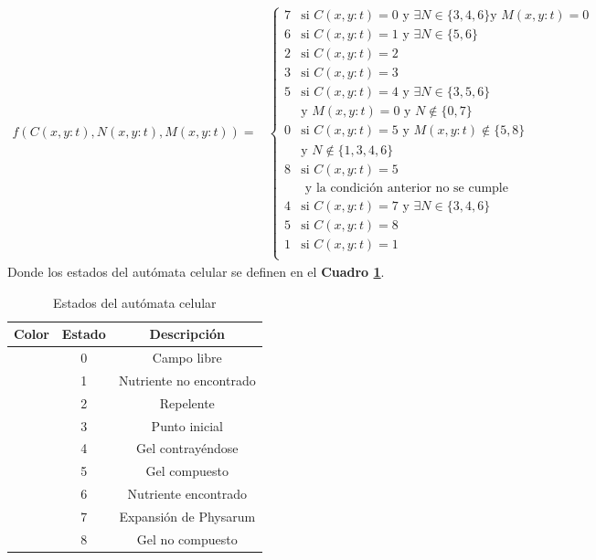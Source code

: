    \begin{equation*}
    \begin{aligned}
    f(C(x,y:t), N(x,y:t), M(x,y:t)) = & \begin{cases}
        7 & \text{si } C(x,y:t) = 0 \text{ y } \exists N \in \{3, 4, 6\} \text{y } M(x,y:t) = 0 \\
        6 & \text{si } C(x,y:t) = 1 \text{ y } \exists N \in \{5, 6\} \\
        2 & \text{si } C(x,y:t) = 2 \\
        3 & \text{si } C(x,y:t) = 3 \\
        5 & \text{si } C(x,y:t) = 4 \text{ y } \exists N \in \{3, 5, 6\} \\
        & \text{y } M(x,y:t) = 0 \text{ y } N \not\in \{0, 7\} \\
        0 & \text{si } C(x,y:t) = 5 \text{ y } M(x,y:t) \not\in \{5, 8\} \\
        & \text{y } N \not\in \{1, 3, 4, 6\} \\
        8 & \text{si } C(x,y:t) = 5 \\
        & \text{ y la condici\'on anterior no se cumple} \\
        4 & \text{si } C(x,y:t) = 7 \text{ y } \exists N \in \{3, 4, 6\} \\
        5 & \text{si } C(x,y:t) = 8 \\
        1 & \text{si } C(x,y:t) = 1 \\
    \end{cases}
    \end{aligned}
    \end{equation*}
    Donde los estados del aut\'omata celular se definen en el \textbf{Cuadro \ref{tab:estados}}.
    \vskip 0.5cm
    \begin{table}[h]
        \begin{center}
            \begin{tabular}{|c|c|c|}
                \hline
                \textbf{Color}&\textbf{Estado}&\textbf{Descripci\'on} \\
                \hline
                \cellcolor{blue} & 0 & Campo libre  \\
                \cellcolor{royalblue} & 1 & Nutriente no encontrado \\
                \cellcolor{red} & 2 & Repelente \\
                \cellcolor{black} & 3 & Punto inicial \\
                \cellcolor{yellow} & 4 & Gel contray\'endose \\
                \cellcolor{darkgreen} & 5 & Gel compuesto \\
                \cellcolor{lemon} & 6 & Nutriente encontrado \\
                \cellcolor{darkgray} & 7 & Expansi\'on de Physarum \\
                \cellcolor{green} & 8 & Gel no compuesto \\
                \hline
            \end{tabular}
        \end{center}
        \caption{Estados del aut\'omata celular}
        \label{tab:estados}
    \end{table}
